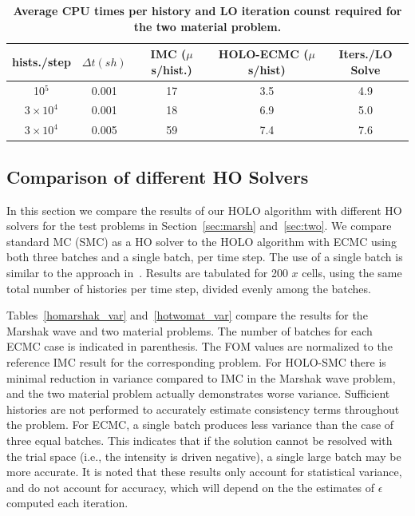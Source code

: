 \documentclass[12pt]{article}
\begin{document}
\begin{center}
\begin{table}[htb!]
\centering
\caption{\label{twomat_table} \textbf{Average CPU times per history and LO iteration
counst required for the two material problem.}}
	\begin{tabular}{|cc|c|cc|} \hline
hists./step & $\Delta t (sh)$ & IMC ($\mu$s/hist.) & HOLO-ECMC ($\mu$s/hist)  &  Iters./LO Solve\\ \hline
10$^5$            &   0.001	& 17  &	3.5   & 4.9 \\
$3\times10^4 $   &    0.001	& 18  &	6.9   &    5.0 \\
$3\times10^4$     &   0.005	& 59  & 7.4   &    7.6 \\ \hline
\end{tabular}
\end{table}

\subsection{Comparison of different HO Solvers}
\label{ho_solvers}

In this section we compare the results of our HOLO algorithm with different HO
solvers for the test problems in Section~\ref{sec:marsh} and~\ref{sec:two}.  We compare standard MC (SMC) as a HO solver to the HOLO algorithm with ECMC using
both three batches and a single batch, per time step.  The use of a single batch is
similar to the approach in~\cite{rmc}.  Results are tabulated for 200 $x$ cells, using the same total
number of histories per time step, divided evenly among the batches.

Tables~\ref{homarshak_var} and~\ref{hotwomat_var} compare the results for the Marshak
wave and two material problems. The number of batches for each ECMC case is indicated
in parenthesis.  The FOM values are normalized to the reference IMC result for the
corresponding problem.  For HOLO-SMC there is
minimal reduction in variance compared to IMC in the Marshak wave problem, and the two
material problem actually demonstrates worse variance.  Sufficient histories are not
performed to accurately estimate consistency terms throughout the problem.  For ECMC,
a single batch produces less variance than the case of three equal batches.  This
indicates that if the solution cannot be resolved with the trial space (i.e., the
intensity is driven negative), a single large batch may be more accurate. It is noted
that these results only account for statistical variance, and do not account for
accuracy, which will depend on the the estimates of $\epsilon$ computed each iteration.   


\end{center}
\end{document}
